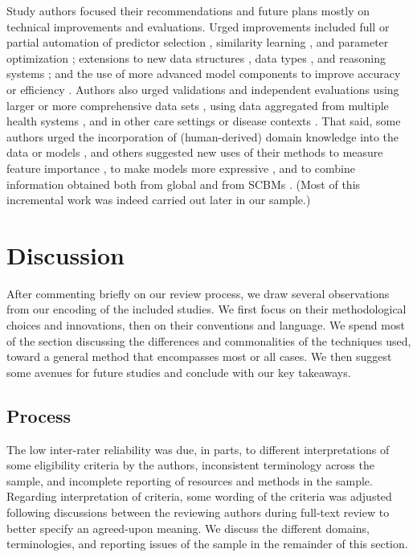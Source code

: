 \documentclass[sn-mathphys,Numbered,pdflatex]{sn-jnl}
\theoremstyle{remark}
\theoremstyle{definition}
\newcommand{\hl}[1]{#1}
\begin{document}
\hl{S}tudy authors focused their recommendations and \hl{future plans}
mostly on technical improvements and evaluations\hl{.} Urged
improvements included full or partial automation of predictor selection
\citep{Mariuzzi1997, Yearwood1997}, similarity learning
\citep{Mariuzzi1997, Wang2019}, and parameter optimization
\citep{Song2006, Lee2017}; extensions to new data structures
\citep{Lopez2011}, data types \citep{Liang2015, Verma2015, Malykh2018},
and reasoning systems \citep{Nicolas2014}; and the use of more advanced
model components to improve accuracy or efficiency
\citep{Lowsky2013, Lee2015, Liang2015, Zhang2018}. Authors also urged
validations and independent evaluations using larger or more
comprehensive data sets \citep{Elter2007, Xu2008, Verma2015, Ng2015},
using data aggregated from multiple health systems
\citep{Lee2015, Lee2017, Tang2021, Ng2021}, and in other care settings
or disease contexts \citep{Song2006, Zhang2018, Tang2021, Ng2021}.
\hl{That said, s}ome authors urged the incorporation of (human-derived)
domain knowledge into the data or models
\citep{Yearwood1997, Wang2019}\hl{, and o}thers suggested new uses of
their \hl{methods} to measure feature importance \citep{Wyns2004}, to
make models more expressive \citep{Lee2015}, and to combine information
obtained both from global and from \hl{SCBM}s \citep{Ng2015}. \hl{(}Most
of this incremental work was indeed carried out \hl{later} in our
sample.\hl{)}

\section{\texorpdfstring{\hl{Discussion}}{}}\label{section}

After commenting briefly on our review process, we draw several
observations from our encoding of the included studies. We first focus
on their methodological choices and innovations, then on their
conventions and language. We spend most of the section discussing the
differences and commonalities of the techniques used, toward a general
method that encompasses most or all cases. We then suggest some avenues
for future studies and conclude with our key takeaways.

\subsection{Process}\label{process}

The low inter-rater reliability was due, in parts, to different
interpretations of some eligibility criteria by the authors,
inconsistent terminology across the sample, and incomplete reporting of
resources and methods in the sample. Regarding interpretation of
criteria, some wording of the criteria was adjusted following
discussions between the reviewing authors during full-text review to
better specify an agreed-upon meaning. \hl{We }discuss the different
domains, terminologies, and reporting issues of the sample in the
remainder of this section.
\end{document}
